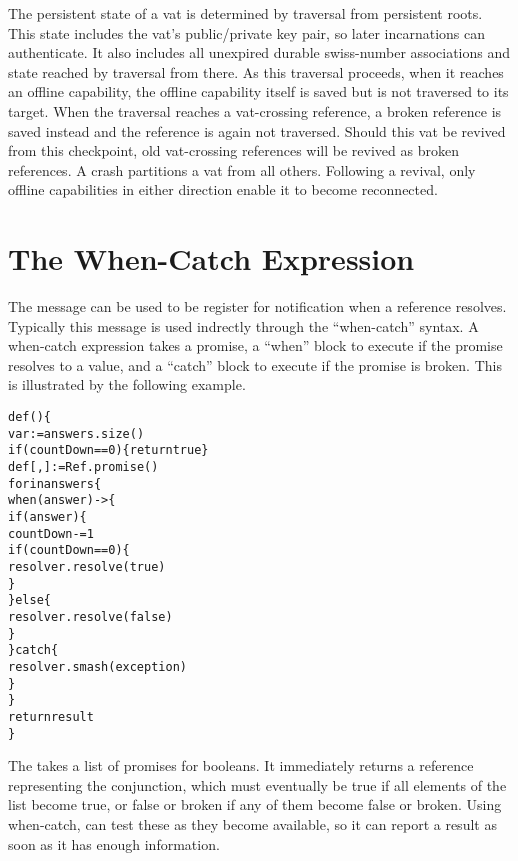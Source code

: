 \documentclass{llncs}
\begin{document}
The persistent state of a vat is determined by traversal from
persistent roots. This state includes the vat's public/private key
pair, so later incarnations can authenticate. It also includes all
unexpired durable swiss-number associations and state reached by
traversal from there. As this traversal proceeds, when it reaches an
offline capability, the offline capability itself is saved but is not
traversed to its target. When the traversal reaches a vat-crossing
reference, a broken reference is saved instead and the reference is
again not traversed. Should this vat be revived from this checkpoint,
old vat-crossing references will be revived as broken references. A
crash partitions a vat from all others. Following a revival, only
offline capabilities in either direction enable it to become
reconnected.

\section{The When-Catch Expression}

The  message can be used to be register for notification
when a reference resolves. Typically this message is used indrectly
through the ``when-catch'' syntax. A when-catch expression takes a
promise, a ``when'' block to execute if the promise resolves to a
value, and a ``catch'' block to execute if the promise is broken.
This is illustrated by the following example.
%
\begin{alltt}
   def () \{
       var  := answers.size()
       if (countDown == 0) \{ return true \}
       def [, ] := Ref.promise()
       for  in answers \{
           when (answer) -> \{
               if (answer) \{
                   countDown -= 1
                   if (countDown == 0) \{
                       resolver.resolve(true)
                   \}
               \} else \{
                   resolver.resolve(false)
               \}
           \} catch  \{
               resolver.smash(exception)
           \}
       \}
       return result
   \}
\end{alltt}
%
The  takes a list of promises for booleans. It
immediately returns a reference representing the conjunction, which
must eventually be true if all elements of the list become true, or
false or broken if any of them become false or broken.
Using when-catch,  can test these as they become
available, so it can report a result as soon as it has enough
information.
\end{document}
